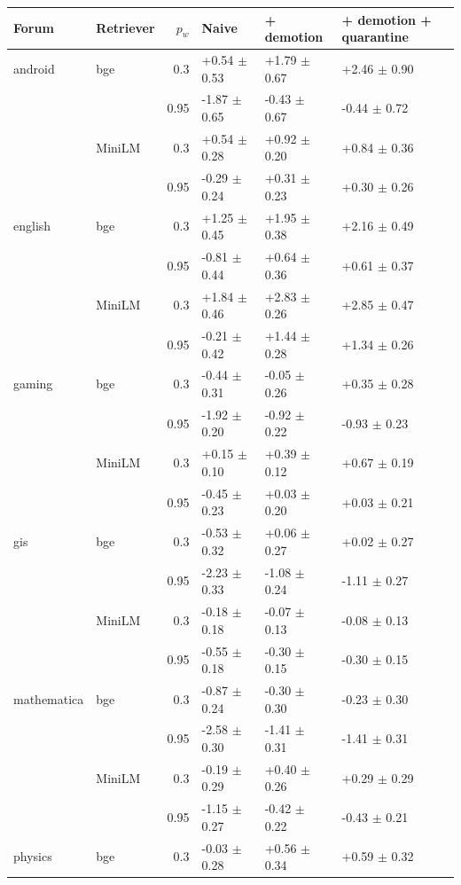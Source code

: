 \begin{tabular}{llrlll}\toprule Forum & Retriever & $p_w$ & Naive & + demotion & + demotion + quarantine\\\midrule
android & bge & 0.3 & +0.54 $\pm$ 0.53 & +1.79 $\pm$ 0.67 & +2.46 $\pm$ 0.90\\
 &  & 0.95 & -1.87 $\pm$ 0.65 & -0.43 $\pm$ 0.67 & -0.44 $\pm$ 0.72\\
 & MiniLM & 0.3 & +0.54 $\pm$ 0.28 & +0.92 $\pm$ 0.20 & +0.84 $\pm$ 0.36\\
 &  & 0.95 & -0.29 $\pm$ 0.24 & +0.31 $\pm$ 0.23 & +0.30 $\pm$ 0.26\\
\addlinespace[1pt]
english & bge & 0.3 & +1.25 $\pm$ 0.45 & +1.95 $\pm$ 0.38 & +2.16 $\pm$ 0.49\\
 &  & 0.95 & -0.81 $\pm$ 0.44 & +0.64 $\pm$ 0.36 & +0.61 $\pm$ 0.37\\
 & MiniLM & 0.3 & +1.84 $\pm$ 0.46 & +2.83 $\pm$ 0.26 & +2.85 $\pm$ 0.47\\
 &  & 0.95 & -0.21 $\pm$ 0.42 & +1.44 $\pm$ 0.28 & +1.34 $\pm$ 0.26\\
\addlinespace[1pt]
gaming & bge & 0.3 & -0.44 $\pm$ 0.31 & -0.05 $\pm$ 0.26 & +0.35 $\pm$ 0.28\\
 &  & 0.95 & -1.92 $\pm$ 0.20 & -0.92 $\pm$ 0.22 & -0.93 $\pm$ 0.23\\
 & MiniLM & 0.3 & +0.15 $\pm$ 0.10 & +0.39 $\pm$ 0.12 & +0.67 $\pm$ 0.19\\
 &  & 0.95 & -0.45 $\pm$ 0.23 & +0.03 $\pm$ 0.20 & +0.03 $\pm$ 0.21\\
\addlinespace[1pt]
gis & bge & 0.3 & -0.53 $\pm$ 0.32 & +0.06 $\pm$ 0.27 & +0.02 $\pm$ 0.27\\
 &  & 0.95 & -2.23 $\pm$ 0.33 & -1.08 $\pm$ 0.24 & -1.11 $\pm$ 0.27\\
 & MiniLM & 0.3 & -0.18 $\pm$ 0.18 & -0.07 $\pm$ 0.13 & -0.08 $\pm$ 0.13\\
 &  & 0.95 & -0.55 $\pm$ 0.18 & -0.30 $\pm$ 0.15 & -0.30 $\pm$ 0.15\\
\addlinespace[1pt]
mathematica & bge & 0.3 & -0.87 $\pm$ 0.24 & -0.30 $\pm$ 0.30 & -0.23 $\pm$ 0.30\\
 &  & 0.95 & -2.58 $\pm$ 0.30 & -1.41 $\pm$ 0.31 & -1.41 $\pm$ 0.31\\
 & MiniLM & 0.3 & -0.19 $\pm$ 0.29 & +0.40 $\pm$ 0.26 & +0.29 $\pm$ 0.29\\
 &  & 0.95 & -1.15 $\pm$ 0.27 & -0.42 $\pm$ 0.22 & -0.43 $\pm$ 0.21\\
\addlinespace[1pt]
physics & bge & 0.3 & -0.03 $\pm$ 0.28 & +0.56 $\pm$ 0.34 & +0.59 $\pm$ 0.32\\

\end{tabular}
